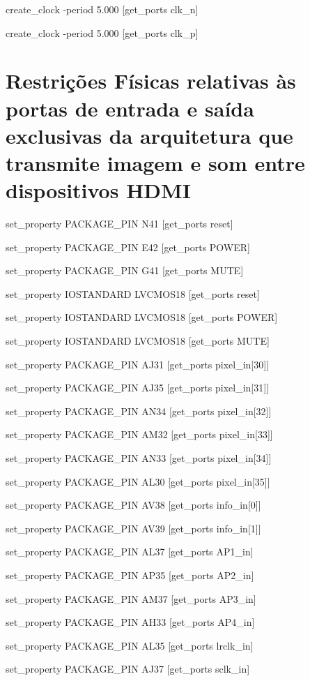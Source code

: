 \small{
	
	create\_clock -period 5.000 [get\_ports clk\_n]
	
	create\_clock -period 5.000 [get\_ports clk\_p]}

\section{Restrições Físicas relativas às portas de entrada e saída exclusivas da arquitetura que transmite imagem e som entre dispositivos HDMI}\label{ap:fisicas_planC_especificas}



set\_property PACKAGE\_PIN N41 [get\_ports reset]

set\_property PACKAGE\_PIN E42 [get\_ports POWER]

set\_property PACKAGE\_PIN G41 [get\_ports MUTE]

set\_property IOSTANDARD LVCMOS18 [get\_ports reset]

set\_property IOSTANDARD LVCMOS18 [get\_ports POWER]

set\_property IOSTANDARD LVCMOS18 [get\_ports MUTE]

set\_property PACKAGE\_PIN AJ31 [get\_ports {pixel\_in[30]}]

set\_property PACKAGE\_PIN AJ35 [get\_ports {pixel\_in[31]}]

set\_property PACKAGE\_PIN AN34 [get\_ports {pixel\_in[32]}]

set\_property PACKAGE\_PIN AM32 [get\_ports {pixel\_in[33]}]

set\_property PACKAGE\_PIN AN33 [get\_ports {pixel\_in[34]}]

set\_property PACKAGE\_PIN AL30 [get\_ports {pixel\_in[35]}]

set\_property PACKAGE\_PIN AV38 [get\_ports {info\_in[0]}]

set\_property PACKAGE\_PIN AV39 [get\_ports {info\_in[1]}]

set\_property PACKAGE\_PIN AL37 [get\_ports AP1\_in]

set\_property PACKAGE\_PIN AP35 [get\_ports AP2\_in]

set\_property PACKAGE\_PIN AM37 [get\_ports AP3\_in]

set\_property PACKAGE\_PIN AH33 [get\_ports AP4\_in]

set\_property PACKAGE\_PIN AL35 [get\_ports lrclk\_in]

set\_property PACKAGE\_PIN AJ37 [get\_ports sclk\_in]

